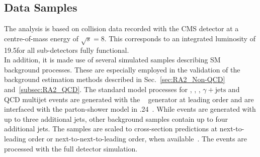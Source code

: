 \subsection{Data Samples}
\label{subsec:RA2_samples_trigger}
The analysis is based on \pp collision data recorded with the CMS detector at a centre-of-mass energy of $\sqrt{s} = 8$\tev. This corresponds to an integrated luminosity of 19.5\fbinv for all sub-detectors fully functional. \\
In addition, it is made use of several simulated samples describing SM background processes. These are especially employed in the validation of the background estimation methods described in Sec.~\ref{sec:RA2_Non-QCD} and~\ref{subsec:RA2_QCD}. The standard model processes for \ttbar, \WJets, \ZJets, $\gamma + \mathrm{{jets}}$ and QCD multijet events are generated with the \madgraph~\cite{Alwall:2014hca} generator at leading order and are interfaced with the parton-shower model in .24~\cite{Sjostrand:2006za}. While \ttbar events are generated with up to three additional jets, other background samples contain up to four additional jets. The samples are scaled to cross-section predictions at next-to-leading order or next-to-next-to-leading order, when available~\cite{Kidonakis:2010dk, Melnikov:2006kv}. The events are processed with the full detector simulation. 
